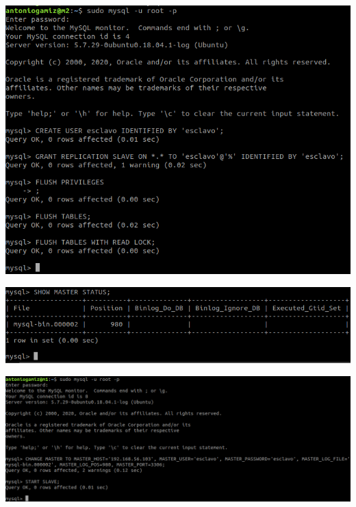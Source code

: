 \documentclass[12pt]{article}
\begin{document}
\begin{center}
\includegraphics[scale=0.35]{23.png}

\includegraphics[scale=0.35]{24.png}

\includegraphics[scale=0.35]{25.png}


\end{center}
\end{document}
